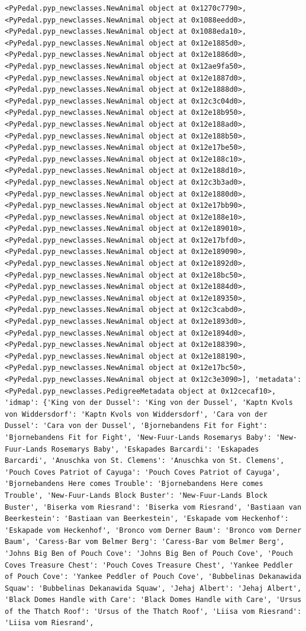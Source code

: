 \documentclass[
  letterpaper,
  DIV=11,
  numbers=noendperiod]{scrreprt}
\begin{document}
\begin{codelisting}
{\begin{verbatim}
<PyPedal.pyp_newclasses.NewAnimal object at 0x1270c7790>, <PyPedal.pyp_newclasses.NewAnimal object at 0x1088eedd0>, <PyPedal.pyp_newclasses.NewAnimal object at 0x1088eda10>, <PyPedal.pyp_newclasses.NewAnimal object at 0x12e1885d0>, <PyPedal.pyp_newclasses.NewAnimal object at 0x12e1886d0>, <PyPedal.pyp_newclasses.NewAnimal object at 0x12ae9fa50>, <PyPedal.pyp_newclasses.NewAnimal object at 0x12e1887d0>, <PyPedal.pyp_newclasses.NewAnimal object at 0x12e1888d0>, <PyPedal.pyp_newclasses.NewAnimal object at 0x12c3c04d0>, <PyPedal.pyp_newclasses.NewAnimal object at 0x12e18b950>, <PyPedal.pyp_newclasses.NewAnimal object at 0x12e188ad0>, <PyPedal.pyp_newclasses.NewAnimal object at 0x12e188b50>, <PyPedal.pyp_newclasses.NewAnimal object at 0x12e17be50>, <PyPedal.pyp_newclasses.NewAnimal object at 0x12e188c10>, <PyPedal.pyp_newclasses.NewAnimal object at 0x12e188d10>, <PyPedal.pyp_newclasses.NewAnimal object at 0x12c3b3ad0>, <PyPedal.pyp_newclasses.NewAnimal object at 0x12e1880d0>, <PyPedal.pyp_newclasses.NewAnimal object at 0x12e17bb90>, <PyPedal.pyp_newclasses.NewAnimal object at 0x12e188e10>, <PyPedal.pyp_newclasses.NewAnimal object at 0x12e189010>, <PyPedal.pyp_newclasses.NewAnimal object at 0x12e17bfd0>, <PyPedal.pyp_newclasses.NewAnimal object at 0x12e189090>, <PyPedal.pyp_newclasses.NewAnimal object at 0x12e1892d0>, <PyPedal.pyp_newclasses.NewAnimal object at 0x12e18bc50>, <PyPedal.pyp_newclasses.NewAnimal object at 0x12e1884d0>, <PyPedal.pyp_newclasses.NewAnimal object at 0x12e189350>, <PyPedal.pyp_newclasses.NewAnimal object at 0x12c3cabd0>, <PyPedal.pyp_newclasses.NewAnimal object at 0x12e1893d0>, <PyPedal.pyp_newclasses.NewAnimal object at 0x12e1894d0>, <PyPedal.pyp_newclasses.NewAnimal object at 0x12e188390>, <PyPedal.pyp_newclasses.NewAnimal object at 0x12e188190>, <PyPedal.pyp_newclasses.NewAnimal object at 0x12e17bc50>, <PyPedal.pyp_newclasses.NewAnimal object at 0x12c3e3090>], 'metadata': <PyPedal.pyp_newclasses.PedigreeMetadata object at 0x12cecaf10>, 'idmap': {'King von der Dussel': 'King von der Dussel', 'Kaptn Kvols von Widdersdorf': 'Kaptn Kvols von Widdersdorf', 'Cara von der Dussel': 'Cara von der Dussel', 'Bjornebandens Fit for Fight': 'Bjornebandens Fit for Fight', 'New-Fuur-Lands Rosemarys Baby': 'New-Fuur-Lands Rosemarys Baby', 'Eskapades Barcardi': 'Eskapades Barcardi', 'Anuschka von St. Clemens': 'Anuschka von St. Clemens', 'Pouch Coves Patriot of Cayuga': 'Pouch Coves Patriot of Cayuga', 'Bjornebandens Here comes Trouble': 'Bjornebandens Here comes Trouble', 'New-Fuur-Lands Block Buster': 'New-Fuur-Lands Block Buster', 'Biserka vom Riesrand': 'Biserka vom Riesrand', 'Bastiaan van Beerkestein': 'Bastiaan van Beerkestein', 'Eskapade vom Heckenhof': 'Eskapade vom Heckenhof', 'Bronco vom Derner Baum': 'Bronco vom Derner Baum', 'Caress-Bar vom Belmer Berg': 'Caress-Bar vom Belmer Berg', 'Johns Big Ben of Pouch Cove': 'Johns Big Ben of Pouch Cove', 'Pouch Coves Treasure Chest': 'Pouch Coves Treasure Chest', 'Yankee Peddler of Pouch Cove': 'Yankee Peddler of Pouch Cove', 'Bubbelinas Dekanawida Squaw': 'Bubbelinas Dekanawida Squaw', 'Jehaj Albert': 'Jehaj Albert', 'Black Domes Handle with Care': 'Black Domes Handle with Care', 'Ursus of the Thatch Roof': 'Ursus of the Thatch Roof', 'Liisa vom Riesrand': 'Liisa vom Riesrand', 
\end{verbatim}}
\end{codelisting}
\end{document}
